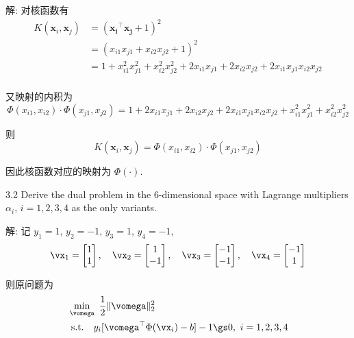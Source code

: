 \documentclass[openany]{ctexbook}
\theoremstyle{kaiti}
\theoremstyle{normal}
\begin{document}
解: 对核函数有
\begin{equation}
  \begin{aligned}
    K(\bm{x}_i,\bm{x}_j)
      &=(\bm{x_i}^{\top}\bm{x_j}+1)^2\\
      &=(x_{i1}x_{j1}+x_{i2}x_{j2}+1)^2\\
      &=1+x_{i1}^2x_{j1}^2+x_{i2}^2x_{j2}^2+2x_{i1}x_{j1}+2x_{i2}x_{j2}+2x_{i1}x_{j1}x_{i2}x_{j2}\\
  \end{aligned}
\end{equation}

又映射的内积为
\begin{equation}
  \Phi(x_{i1},x_{i2})\cdot\Phi(x_{j1},x_{j2})
  =1+2x_{i1}x_{j1}+2x_{i2}x_{j2}+2x_{i1}x_{j1}x_{i2}x_{j2}+x_{i1}^2x_{j1}^2+x_{i2}^2x_{j2}^2
\end{equation}

则
\begin{equation}
  K(\bm{x}_i,\bm{x}_j)=\Phi(x_{i1},x_{i2})\cdot\Phi(x_{j1},x_{j2})
\end{equation}

因此核函数对应的映射为 $\Phi(\cdot)$.

3.2 Derive the dual problem in the 6-dimensional space with Lagrange multipliers $\alpha_i$, $i=1,2,3,4$ as the only variants.

解: 记 $y_1=1$, $y_2=-1$, $y_3=1$, $y_4=-1$, 
\begin{equation}
  \vx_1=
  \begin{bmatrix}
    1\\ 1\\
  \end{bmatrix},\quad
  \vx_2=
  \begin{bmatrix}
    1\\ -1\\
  \end{bmatrix},\quad
  \vx_3=
  \begin{bmatrix}
    -1\\ -1\\
  \end{bmatrix},\quad
  \vx_4=
  \begin{bmatrix}
    -1\\ 1\\
  \end{bmatrix}
\end{equation}

则原问题为
\begin{equation}
  \begin{aligned}
    &\min_{\vomega}~\frac{1}{2}\|\vomega\|_2^2 \\
    &~\mathrm{s.t.}~~~y_i[\vomega^{\top}\Phi(\vx_i)-b]-1\gs0,~i=1,2,3,4
  \end{aligned}
\end{equation}
\end{document}
